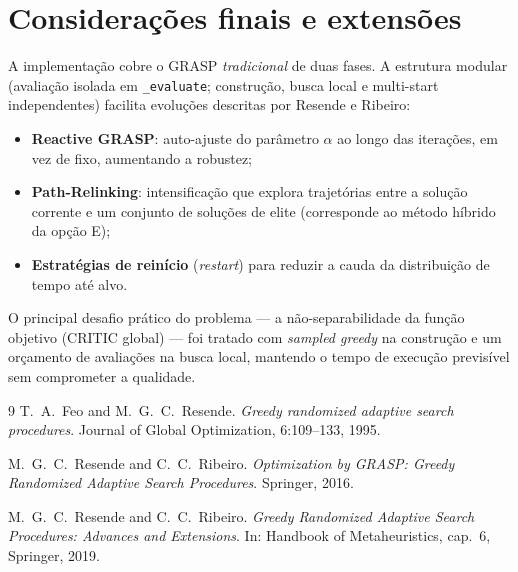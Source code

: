 \documentclass[11pt,a4paper]{article}
\begin{document}
\section{Considerações finais e extensões}

A implementação cobre o GRASP \emph{tradicional} de duas fases. A estrutura
modular (avaliação isolada em \texttt{\_evaluate}; construção, busca local e
multi-start independentes) facilita evoluções descritas por Resende e Ribeiro:

\begin{itemize}\setlength\itemsep{2pt}
\item \textbf{Reactive GRASP}: auto-ajuste do parâmetro $\alpha$ ao longo das
iterações, em vez de fixo, aumentando a robustez;
\item \textbf{Path-Relinking}: intensificação que explora trajetórias entre a
solução corrente e um conjunto de soluções de elite (corresponde ao método
híbrido da opção E);
\item \textbf{Estratégias de reinício} (\emph{restart}) para reduzir a cauda da
distribuição de tempo até alvo.
\end{itemize}

O principal desafio prático do problema --- a não-separabilidade da função
objetivo (CRITIC global) --- foi tratado com \emph{sampled greedy} na construção e
um orçamento de avaliações na busca local, mantendo o tempo de execução
previsível sem comprometer a qualidade.

\begin{thebibliography}{9}
T.~A.~Feo and M.~G.~C.~Resende.
\emph{Greedy randomized adaptive search procedures}.
Journal of Global Optimization, 6:109--133, 1995.

M.~G.~C.~Resende and C.~C.~Ribeiro.
\emph{Optimization by GRASP: Greedy Randomized Adaptive Search Procedures}.
Springer, 2016.

M.~G.~C.~Resende and C.~C.~Ribeiro.
\emph{Greedy Randomized Adaptive Search Procedures: Advances and Extensions}.
In: Handbook of Metaheuristics, cap.~6, Springer, 2019.
\end{thebibliography}
\end{document}
